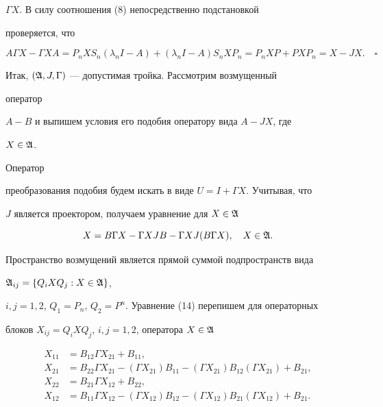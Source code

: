 $\Gamma X$. В силу соотношения (8) непосредственно подстановкой


проверяется, что


$$


A\Gamma X-\Gamma XA=P_nXS_n(\lambda_nI-A)+


(\lambda_nI-A)S_nXP_n=P_nXP+PXP_n=X-JX.\quad\square


$$





Итак, $(\frak A,J,\Gamma)$ --- допустимая тройка. Рассмотрим возмущенный


оператор


$A-B$ и выпишем условия его подобия оператору вида $A-JX$, где


$X\in\frak A$.


Оператор


преобразования подобия будем искать в виде $U=I+\Gamma X$. Учитывая, что


$J$ является проектором, получаем уравнение для $X\in\frak A$


\begin{equation}


X=B\Gamma X-\Gamma XJB-\Gamma XJ(B\Gamma X),\quad X\in\frak A.


\end{equation}


Пространство возмущений является прямой суммой подпространств вида


$\frak A_{ij}=\{Q_iXQ_j:X\in\frak A\}$,


$i,j=1,2$, $Q_1=P_n$, $Q_2=P^n$. Уравнение (14) перепишем для операторных


блоков $X_{ij}=Q_iXQ_j$, $i,j=1,2$, оператора $X\in\frak A$


\begin{align}


X_{11}&=B_{12}\Gamma X_{21}+B_{11},\\


X_{21}&=B_{22}\Gamma X_{21}-(\Gamma X_{21})B_{11}-


(\Gamma X_{21})B_{12}(\Gamma X_{21})+B_{21},\\


X_{22}&=B_{21}\Gamma X_{12}+B_{22},\\


X_{12}&=B_{11}\Gamma X_{12}-(\Gamma X_{12})B_{12}-


(\Gamma X_{12})B_{21}(\Gamma X_{12})+B_{21}.


\end{align}





